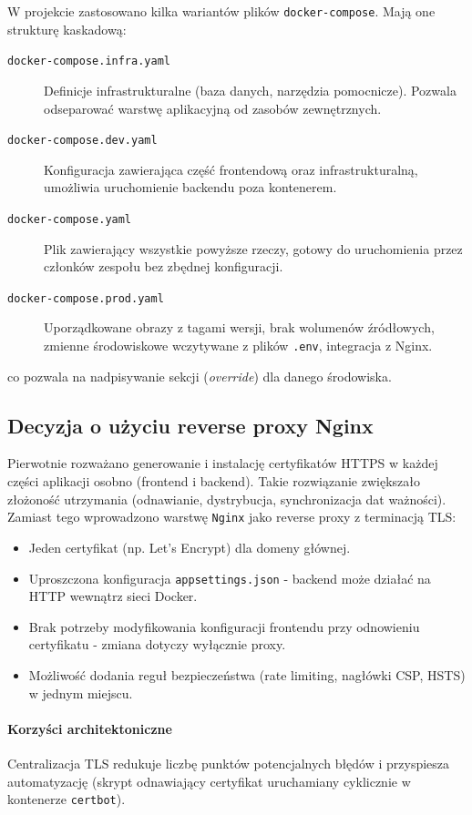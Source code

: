 W projekcie zastosowano kilka wariantów plików \texttt{docker-compose}. Mają one strukturę kaskadową:
\begin{description}
    \item[\texttt{docker-compose.infra.yaml}] Definicje infrastrukturalne (baza danych, narzędzia pomocnicze). Pozwala odseparować warstwę aplikacyjną od zasobów zewnętrznych.
    \item[\texttt{docker-compose.dev.yaml}] Konfiguracja zawierająca część frontendową oraz infrastrukturalną, umożliwia uruchomienie backendu poza kontenerem. 
    \item[\texttt{docker-compose.yaml}] Plik zawierający wszystkie powyższe rzeczy, gotowy do uruchomienia przez członków zespołu bez zbędnej konfiguracji.
    \item[\texttt{docker-compose.prod.yaml}] Uporządkowane obrazy z tagami wersji, brak wolumenów źródłowych, zmienne środowiskowe wczytywane z plików \texttt{.env}, integracja z Nginx.
\end{description}

co pozwala na nadpisywanie sekcji (\textit{override}) dla danego środowiska.

\subsection{Decyzja o użyciu reverse proxy Nginx}

Pierwotnie rozważano generowanie i instalację certyfikatów HTTPS w każdej części aplikacji osobno (frontend i backend). Takie rozwiązanie zwiększało złożoność utrzymania (odnawianie, dystrybucja, synchronizacja dat ważności). Zamiast tego wprowadzono warstwę \texttt{Nginx} jako reverse proxy z terminacją TLS:
\begin{itemize}
    \item Jeden certyfikat (np. Let's Encrypt) dla domeny głównej.
    \item Uproszczona konfiguracja \texttt{appsettings.json} - backend może działać na HTTP wewnątrz sieci Docker.
    \item Brak potrzeby modyfikowania konfiguracji frontendu przy odnowieniu certyfikatu - zmiana dotyczy wyłącznie proxy.
    \item Możliwość dodania reguł bezpieczeństwa (rate limiting, nagłówki CSP, HSTS) w jednym miejscu.
\end{itemize}

\paragraph{Korzyści architektoniczne} Centralizacja TLS redukuje liczbę punktów potencjalnych błędów i przyspiesza automatyzację (skrypt odnawiający certyfikat uruchamiany cyklicznie w kontenerze \texttt{certbot}).

